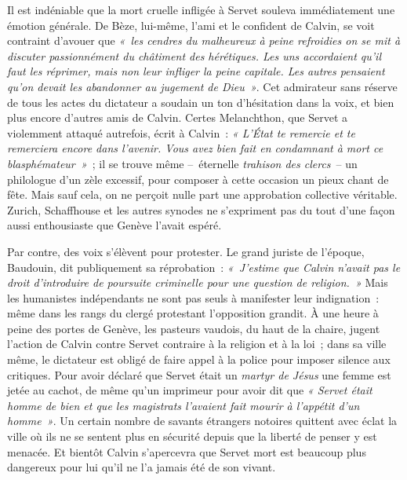 \documentclass[french,twoside]{book} %
\newcommand{\astermono}{\medskip\centerline{\color{rubric}\large\selectfont{\syms ✻}}\medskip\par}%
\begin{document}
\noindent Il est indéniable que la mort cruelle infligée à Servet souleva immédiatement une émotion générale. De Bèze, lui-même, l’ami et le confident de Calvin, se voit contraint d’avouer que \emph{« les cendres du malheureux à peine refroidies on se mit à discuter passionnément du châtiment des hérétiques. Les uns accordaient qu’il faut les réprimer, mais non leur infliger la peine capitale. Les autres pensaient qu’on devait les abandonner au jugement de Dieu »}. Cet admirateur sans réserve de tous les actes du dictateur a soudain un ton d’hésitation dans la voix, et bien plus encore d’autres amis de Calvin. Certes Melanchthon, que Servet a violemment attaqué autrefois, écrit à Calvin : \emph{« L’État te remercie et te remerciera encore dans l’avenir. Vous avez bien fait en condamnant à mort ce blasphémateur »} ; il se trouve même – éternelle \emph{trahison des clercs} – un philologue d’un zèle excessif, pour composer à cette occasion un pieux chant de fête. Mais sauf cela, on ne perçoit nulle part une approbation collective véritable. Zurich, Schaffhouse et les autres synodes ne s’expriment pas du tout d’une façon aussi enthousiaste que Genève l’avait espéré.\par
Par contre, des voix s’élèvent pour protester. Le grand juriste de l’époque, Baudouin, dit publiquement sa réprobation : \emph{« J’estime que Calvin n’avait pas le droit d’introduire de poursuite criminelle pour une question de religion. »} Mais les humanistes indépendants ne sont pas seuls à manifester leur indignation : même dans les rangs du clergé protestant l’opposition grandit. À une heure à peine des portes de Genève, les pasteurs vaudois, du haut de la chaire, jugent l’action de Calvin contre Servet contraire à la religion et à la loi ; dans sa ville même, le dictateur est obligé de faire appel à la police pour imposer silence aux critiques. Pour avoir déclaré que Servet était un \emph{martyr de Jésus} une femme est jetée au cachot, de même qu’un imprimeur pour avoir dit que \emph{« Servet était homme de bien et que les magistrats l’avaient fait mourir à l’appétit d’un homme »}. Un certain nombre de savants étrangers notoires quittent avec éclat la ville où ils ne se sentent plus en sécurité depuis que la liberté de penser y est menacée. Et bientôt Calvin s’apercevra que Servet mort est beaucoup plus dangereux pour lui qu’il ne l’a jamais été de son vivant.\par

\astermono
\end{document}
